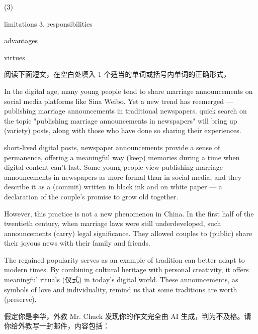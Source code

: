 \documentclass{英语试卷}
\begin{document}
\begin{choices}(3)
  \item limitations 3. responsibilities
  \item advantages
  \item virtues
\end{choices}
\par 阅读下面短文，在空白处填入 1 个适当的单词或括号内单词的正确形式，\par
\par In the digital age, many young people tend to share marriage announcements on social media platforms like Sina Weibo. Yet a new trend has reemerged — publishing marriage announcements in traditional newspapers.  quick search on the topic "publishing marriage announcements in newspapers" will bring up (variety) posts, along with those who have done so sharing their experiences.\par
\par {} short-lived digital posts, newspaper announcements provide a sense of permanence, offering a meaningful way  (keep) memories during a time when digital content can't last. Some young people view publishing marriage announcements in newspapers as more formal than  in social media, and they describe it as a  (commit) written in black ink and on white paper — a declaration of the couple's promise to grow old together.\par
\par However, this practice is not a new phenomenon in China. In the first half of the twentieth century, when marriage laws were still underdeveloped, such announcements  (carry) legal significance. They allowed couples to  (public) share their joyous news with their family and friends.\par
\par The regained popularity serves as an example of  tradition can better adapt to modern times. By combining cultural heritage with personal creativity, it offers meaningful rituals (仪式) in today's digital world. These announcements, as symbols of love and individuality, remind us that some traditions are worth  (preserve).\par
{}
\par 假定你是李华，外教 Mr. Chuck 发现你的作文完全由 AI 生成，判为不及格。请你给外教写一封邮件，内容包括：\par
\end{document}
